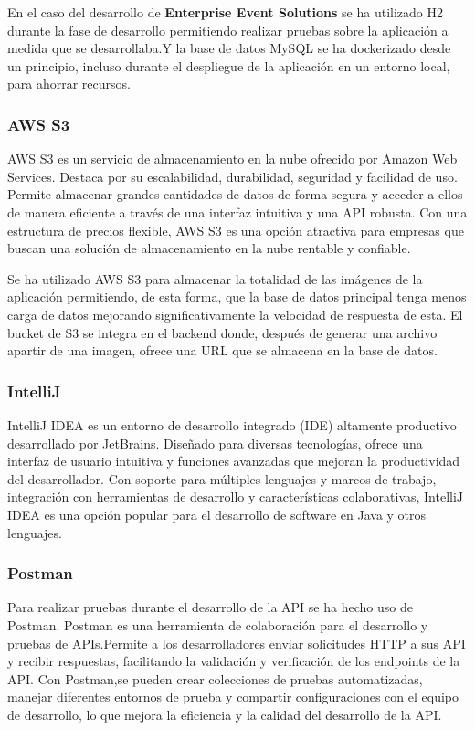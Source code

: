 En el caso del desarrollo de \textbf{Enterprise Event Solutions} se ha utilizado H2 durante la fase de desarrollo permitiendo realizar pruebas sobre la aplicación a medida que se desarrollaba.Y 
la base de datos MySQL se ha dockerizado desde un principio, incluso durante el despliegue de la aplicación en un entorno local, para ahorrar recursos.

\subsubsection{AWS S3}

AWS S3 es un servicio de almacenamiento en la nube ofrecido por Amazon Web Services. Destaca por su escalabilidad, durabilidad, seguridad y
facilidad de uso. Permite almacenar grandes cantidades de datos de forma segura y acceder a ellos de manera eficiente a través de una interfaz
intuitiva y una API robusta. Con una estructura de precios flexible, AWS S3 es una opción atractiva para empresas que buscan una solución de
almacenamiento en la nube rentable y confiable.

Se ha utilizado AWS S3 para almacenar la totalidad de las imágenes de la aplicación permitiendo, de esta forma, que la base de datos principal tenga menos carga de datos 
mejorando significativamente la velocidad de respuesta de esta. El bucket de S3 se integra en el backend donde, después de generar una archivo apartir de una imagen, ofrece una URL
que se almacena en la base de datos. 

\subsubsection{IntelliJ}
IntelliJ IDEA es un entorno de desarrollo integrado (IDE) altamente productivo desarrollado por JetBrains.
Diseñado para diversas tecnologías, ofrece una interfaz de usuario intuitiva y funciones avanzadas que mejoran la
productividad del desarrollador. Con soporte para múltiples lenguajes y marcos de trabajo, integración con herramientas de desarrollo y
características colaborativas, IntelliJ IDEA es una opción popular para el desarrollo de software en Java y otros lenguajes.


\subsubsection{Postman}
Para realizar pruebas durante el desarrollo de la API se ha hecho uso de Postman. 
Postman es una herramienta de colaboración para el desarrollo y pruebas de APIs.Permite a los desarrolladores enviar solicitudes HTTP a sus API y recibir respuestas,
facilitando la validación y verificación de los endpoints de la API. Con Postman,se pueden crear colecciones de pruebas automatizadas, manejar diferentes entornos de
prueba y compartir configuraciones con el equipo de desarrollo, lo que mejora la eficiencia y la calidad del desarrollo de la API.

